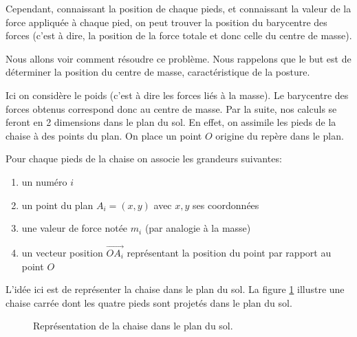 \documentclass{polytech/polytech}
\begin{document}
Cependant, connaissant la position de chaque pieds, et connaissant la valeur de la force appliquée à chaque pied, on peut trouver la position du barycentre des forces (c'est à dire, la position de la force totale et donc celle du centre de masse). 

Nous allons voir comment résoudre ce problème. Nous rappelons que le but est de déterminer la position du centre de masse, caractéristique de la posture.

Ici on considère le poids (c'est à dire les forces liés à la masse). Le barycentre des forces obtenus correspond donc au centre de masse. 
Par la suite, nos calculs se feront en 2 dimensions dans le plan du sol. En effet, on assimile les pieds de la chaise à des points du plan. On place un point $O$ origine du repère dans le plan. 

Pour chaque pieds de la chaise on associe les grandeurs suivantes:

\begin{enumerate}
\item un numéro $i$
\item un point du plan $A_i=(x,y)$ avec $x,y$ ses coordonnées
\item une valeur de force notée $m_i$ (par analogie à la masse)
\item un vecteur position $\vec{OA_i}$ représentant la position du point par rapport au point $O$
\end{enumerate}

L'idée ici est de représenter la chaise dans le plan du sol. La figure \ref{fig:schem_plan_sol_math} illustre une chaise carrée dont les quatre pieds sont projetés dans le plan du sol.


\begin{figure}[htbp]
\begin{center}
\end{center}
\caption{Représentation de la chaise dans le plan du sol.}
\label{fig:schem_plan_sol_math}
\end{figure}
\end{document}
